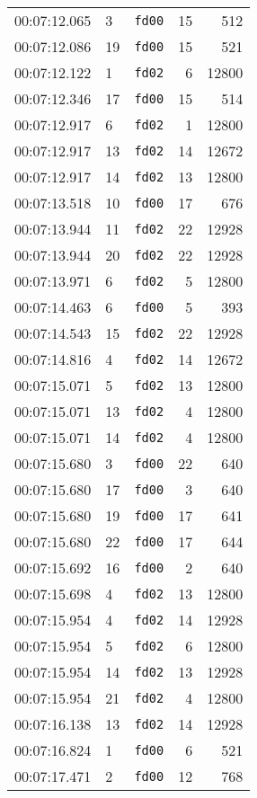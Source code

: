 \documentclass{article}
\begin{document}
\begin{longtable}{lllrr}
00:07:12.065 & 3 & \texttt{fd00} & 15 & 512 \\
00:07:12.086 & 19 & \texttt{fd00} & 15 & 521 \\
00:07:12.122 & 1 & \texttt{fd02} & 6 & 12800 \\
00:07:12.346 & 17 & \texttt{fd00} & 15 & 514 \\
00:07:12.917 & 6 & \texttt{fd02} & 1 & 12800 \\
00:07:12.917 & 13 & \texttt{fd02} & 14 & 12672 \\
00:07:12.917 & 14 & \texttt{fd02} & 13 & 12800 \\
00:07:13.518 & 10 & \texttt{fd00} & 17 & 676 \\
00:07:13.944 & 11 & \texttt{fd02} & 22 & 12928 \\
00:07:13.944 & 20 & \texttt{fd02} & 22 & 12928 \\
00:07:13.971 & 6 & \texttt{fd02} & 5 & 12800 \\
00:07:14.463 & 6 & \texttt{fd00} & 5 & 393 \\
00:07:14.543 & 15 & \texttt{fd02} & 22 & 12928 \\
00:07:14.816 & 4 & \texttt{fd02} & 14 & 12672 \\
00:07:15.071 & 5 & \texttt{fd02} & 13 & 12800 \\
00:07:15.071 & 13 & \texttt{fd02} & 4 & 12800 \\
00:07:15.071 & 14 & \texttt{fd02} & 4 & 12800 \\
00:07:15.680 & 3 & \texttt{fd00} & 22 & 640 \\
00:07:15.680 & 17 & \texttt{fd00} & 3 & 640 \\
00:07:15.680 & 19 & \texttt{fd00} & 17 & 641 \\
00:07:15.680 & 22 & \texttt{fd00} & 17 & 644 \\
00:07:15.692 & 16 & \texttt{fd00} & 2 & 640 \\
00:07:15.698 & 4 & \texttt{fd02} & 13 & 12800 \\
00:07:15.954 & 4 & \texttt{fd02} & 14 & 12928 \\
00:07:15.954 & 5 & \texttt{fd02} & 6 & 12800 \\
00:07:15.954 & 14 & \texttt{fd02} & 13 & 12928 \\
00:07:15.954 & 21 & \texttt{fd02} & 4 & 12800 \\
00:07:16.138 & 13 & \texttt{fd02} & 14 & 12928 \\
00:07:16.824 & 1 & \texttt{fd00} & 6 & 521 \\
00:07:17.471 & 2 & \texttt{fd00} & 12 & 768 \\

\end{longtable}
\end{document}
